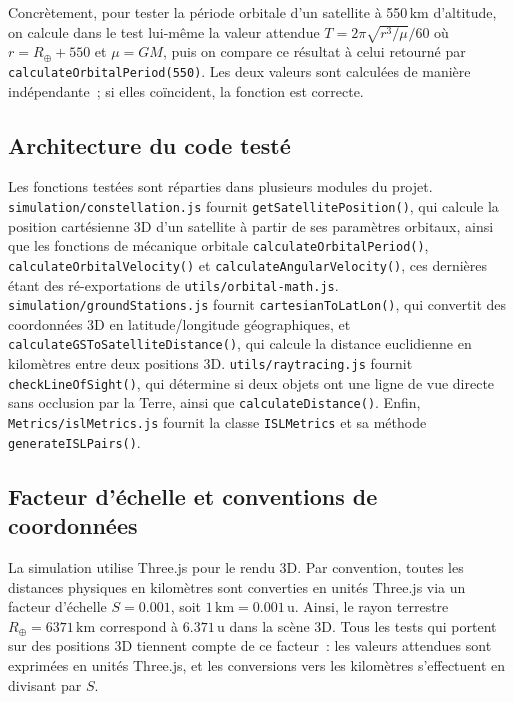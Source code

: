 \documentclass[12pt,a4paper]{article}
\begin{document}
Concrètement, pour tester la période orbitale d'un satellite à 550\,km d'altitude, on calcule dans le test lui-même la valeur attendue $T = 2\pi\sqrt{r^3/\mu}/60$ où $r = R_\oplus + 550$ et $\mu = GM$, puis on compare ce résultat à celui retourné par \texttt{calculateOrbitalPeriod(550)}. Les deux valeurs sont calculées de manière indépendante~; si elles coïncident, la fonction est correcte.

\subsection{Architecture du code testé}

Les fonctions testées sont réparties dans plusieurs modules du projet. \texttt{simulation/constellation.js} fournit \texttt{getSatellitePosition()}, qui calcule la position cartésienne 3D d'un satellite à partir de ses paramètres orbitaux, ainsi que les fonctions de mécanique orbitale \texttt{calculateOrbitalPeriod()}, \texttt{calculateOrbitalVelocity()} et \texttt{calculateAngularVelocity()}, ces dernières étant des ré-exportations de \texttt{utils/orbital-math.js}. \texttt{simulation/groundStations.js} fournit \texttt{cartesianToLatLon()}, qui convertit des coordonnées 3D en latitude/longitude géographiques, et \texttt{calculateGSToSatelliteDistance()}, qui calcule la distance euclidienne en kilomètres entre deux positions 3D. \texttt{utils/raytracing.js} fournit \texttt{checkLineOfSight()}, qui détermine si deux objets ont une ligne de vue directe sans occlusion par la Terre, ainsi que \texttt{calculateDistance()}. Enfin, \texttt{Metrics/islMetrics.js} fournit la classe \texttt{ISLMetrics} et sa méthode \texttt{generateISLPairs()}.

\subsection{Facteur d'échelle et conventions de coordonnées}

La simulation utilise Three.js pour le rendu 3D. Par convention, toutes les distances physiques en kilomètres sont converties en unités Three.js via un facteur d'échelle $S = 0.001$, soit $1\,\text{km} = 0.001\,\text{u}$. Ainsi, le rayon terrestre $R_\oplus = 6371\,\text{km}$ correspond à $6.371\,\text{u}$ dans la scène 3D. Tous les tests qui portent sur des positions 3D tiennent compte de ce facteur~: les valeurs attendues sont exprimées en unités Three.js, et les conversions vers les kilomètres s'effectuent en divisant par $S$.
\end{document}
